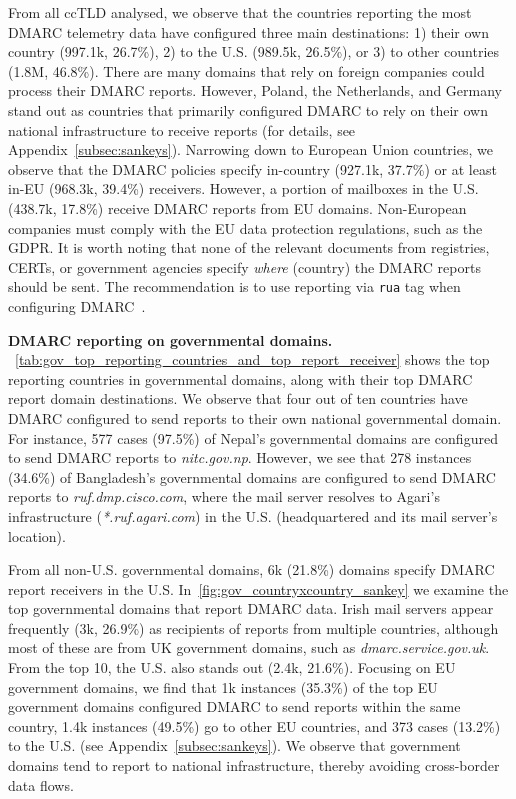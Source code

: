 From all \gls{ccTLD} analysed, we observe that the countries reporting the most \gls{DMARC} telemetry data have configured three main destinations: 1) their own country (997.1k, 26.7\%), 2) to the U.S. (989.5k, 26.5\%), or 3) to other countries (1.8M, 46.8\%).
There are many domains that rely on foreign companies could process their \gls{DMARC} reports. However, Poland, the Netherlands, and Germany stand out as countries that primarily configured \gls{DMARC} to rely on their own national infrastructure to receive reports (for details, see Appendix~\ref{subsec:sankeys}).
Narrowing down to European Union countries, we observe that the \gls{DMARC} policies specify in-country (927.1k, 37.7\%) or at least in-EU (968.3k, 39.4\%) receivers. However, a portion of mailboxes in the U.S. (438.7k, 17.8\%) receive \gls{DMARC} reports from EU domains.
Non-European companies must comply with the EU data protection regulations, such as the GDPR.
It is worth noting that none of the relevant documents from registries, CERTs, or government agencies specify \textit{where} (\eg country) the \gls{DMARC} reports should be sent.
The recommendation is to use reporting via \texttt{rua} tag when configuring \gls{DMARC}~\cite{_BSITR03182Email_}.

\textbf{DMARC reporting on governmental domains.}
~\cref{tab:gov_top_reporting_countries_and_top_report_receiver} shows the top reporting countries in governmental domains, along with their top \gls{DMARC} report domain destinations.
We observe that four out of ten countries have \gls{DMARC} configured to send reports to their own national governmental domain.
For instance, 577 cases (97.5\%) of Nepal's governmental domains are configured to send \gls{DMARC} reports to \textit{nitc.gov.np}.
However, we see that 278 instances (34.6\%) of Bangladesh's governmental domains are configured to send \gls{DMARC} reports to \textit{ruf.dmp.cisco.com}, where the mail server resolves to Agari's infrastructure (\textit{*.ruf.agari.com}) in the U.S. (headquartered and its mail server's location).

From all non-U.S. governmental domains, 6k (21.8\%) domains specify \gls{DMARC} report receivers in the U.S. In~\cref{fig:gov_countryxcountry_sankey} we examine the top governmental domains that report \gls{DMARC} data. Irish mail servers appear frequently (3k, 26.9\%) as recipients of reports from multiple countries, although most of these are from UK government domains, such as \textit{dmarc.service.gov.uk}. From the top 10, the U.S. also stands out (2.4k, 21.6\%).
Focusing on EU government domains, we find that 1k instances (35.3\%) of the top EU government domains configured \gls{DMARC} to send reports within the same country, 1.4k instances (49.5\%) go to other EU countries, and 373 cases (13.2\%) to the U.S. (see Appendix~\ref{subsec:sankeys}).
We observe that government domains tend to report to national infrastructure, thereby avoiding cross-border data flows.

